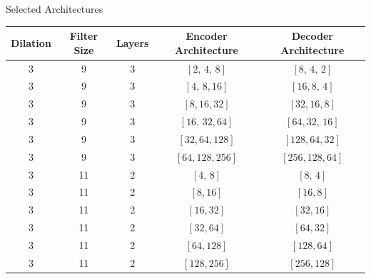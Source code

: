 \documentclass[8pt,xcolor=dvipsnames,compress]{beamer}
\begin{document}
\begin{frame}{Selected Architectures}
\footnotesize
\begin{table}[h!]
    \centering
    \renewcommand{\arraystretch}{1.4}
    \begin{tabular}{|c|c|c|c|c|}
    \hline
    \textbf{Dilation} & \textbf{Filter Size} & \textbf{Layers} & \textbf{Encoder Architecture} & \textbf{Decoder Architecture} \\
    \hline
        3 & 9 & 3 & $[2,\,4,\,8]$ & $[8,\,4,\,2]$ \\
        3 & 9 & 3 & $[4,\,8,16]$ & $[16,8,\,4]$ \\
        3 & 9 & 3 & $[8,16,32]$ & $[32,16,8]$ \\
        3 & 9 & 3 & $[16,\,32,64]$ & $[64,32,\,16]$ \\
        3 & 9 & 3 & $[32,64,128]$ & $[128,64,32]$ \\
        3 & 9 & 3 & $[64,128,256]$ & $[256,128,64]$ \\
        \hline
        3 & 11 & 2 & $[4,\,8]$ & $[8,\,4]$ \\
        3 & 11 & 2 & $[8,16]$ & $[16,8]$ \\
        3 & 11 & 2 & $[16,32]$ & $[32,16]$ \\
        3 & 11 & 2 & $[32,64]$ & $[64,32]$ \\
        3 & 11 & 2 & $[64,128]$ & $[128,64]$ \\
        3 & 11 & 2 & $[128,256]$ & $[256,128]$ \\
        \hline
        \end{tabular}
    \label{tab:tcn_architectures}
\end{table}
\end{frame}
\end{document}
